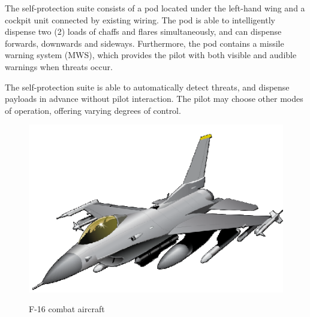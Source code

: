 The self-protection suite consists of a pod located under the left-hand wing and a cockpit unit connected by existing wiring. The pod is able to intelligently dispense two (2) loads of chaffs and flares simultaneously, and can dispense forwards, downwards and sideways. Furthermore, the pod contains a missile warning system (MWS), which provides the pilot with both visible and audible warnings when threats occur.

The self-protection suite is able to automatically detect threats, and dispense payloads in advance without pilot interaction. The pilot may choose other modes of operation, offering varying degrees of control.
\begin{figure}[h]
	\centering
	\includegraphics[scale=0.5]{./images/F16.PNG}\\
	\caption{F-16 combat aircraft}
\end{figure}
